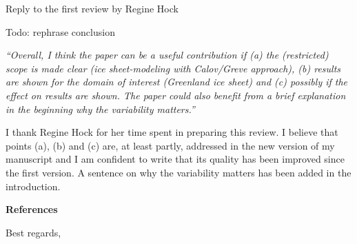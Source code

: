 \documentclass{letter}
\newcommand{\rev}[0]{\color{blue!50!black}\it}
\newcommand{\textrev}[1]{{\rev``#1''}}
\newcommand{\todo}[1]{\textcolor{red!50!black}{Todo: #1}\\}
\begin{document}
\begin{letter}{Reply to the first review by Regine Hock}
\begin{enumerate}[resume]
    \todo{rephrase conclusion}

\end{enumerate}


\textrev{Overall, I think the paper can be a useful contribution if (a) the (restricted) scope is made clear (ice sheet-modeling with Calov/Greve approach), (b) results are shown for the domain of interest (Greenland ice sheet) and (c) possibly if the effect on results are shown. The paper could also benefit from a brief explanation in the beginning why the variability matters.}

I thank Regine Hock for her time spent in preparing this review. I believe that points (a), (b) and (c) are, at least partly, addressed in the new version of my manuscript and I am confident to write that its quality has been improved since the first version. A sentence on why the variability matters has been added in the introduction.

\textbf{References}



\closing{Best regards,}

\end{letter}
\end{document}

